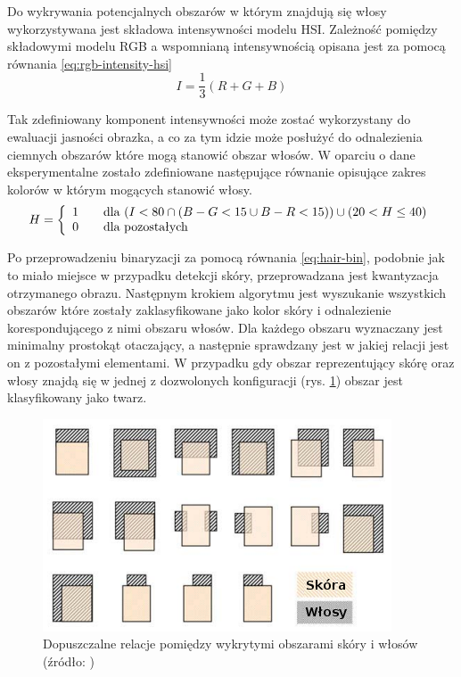Do wykrywania potencjalnych obszarów w którym znajdują się włosy wykorzystywana
jest składowa intensywności modelu HSI. Zależność pomiędzy składowymi modelu RGB
a wspomnianą intensywnością opisana jest za pomocą równania
\ref{eq:rgb-intensity-hsi}
\begin{equation}
	\label{eq:rgb-intensity-hsi}
	I = \frac{1}{3}\left(R+G+B\right)
\end{equation}

Tak zdefiniowany komponent intensywności może zostać wykorzystany do ewaluacji
jasności obrazka, a co za tym idzie może posłużyć do odnalezienia ciemnych
obszarów które mogą stanowić obszar włosów. W oparciu o dane eksperymentalne
zostało zdefiniowane następujące równanie opisujące zakres
kolorów w którym mogących stanowić włosy. 
\begin{equation}
\label{eq:hair-bin}
H = \left\{ 
\begin{array}{l l}
  1 & \quad \mbox{dla $\left( I < 80 \cap \left(B - G < 15 \cup B - R < 15
  \right) \right) \cup  \left( 20 < H \leq 40 \right) $} \\ 0 & \quad
  \mbox{dla pozostałych}\\ \end{array} \right.
\end{equation}

Po przeprowadzeniu binaryzacji za pomocą równania \ref{eq:hair-bin},  podobnie
jak to miało miejsce w przypadku detekcji skóry, przeprowadzana jest kwantyzacja
otrzymanego obrazu. Następnym krokiem algorytmu jest wyszukanie wszystkich
obszarów które zostały zaklasyfikowane jako kolor skóry i odnalezienie
korespondującego z nimi obszaru włosów. Dla każdego obszaru wyznaczany jest
minimalny prostokąt otaczający, a następnie sprawdzany jest w jakiej relacji
jest on z pozostałymi elementami. W przypadku gdy obszar reprezentujący skórę oraz
włosy znajdą się w jednej z dozwolonych konfiguracji (rys.
\ref{fig:supported-relations}) obszar jest klasyfikowany jako twarz. 

\begin{figure}[ht!]
 \centering
 \includegraphics[width=\textwidth]{../images/ch04/bounding-boxes.png}
 \caption{Dopuszczalne relacje pomiędzy wykrytymi obszarami skóry i włosów
 (źródło: \cite{SimpleFaceDetectionAlgorithm})}
 \label{fig:supported-relations}
\end{figure}

